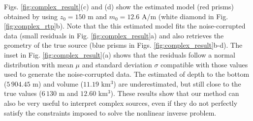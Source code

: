 Figs. \ref{fig:complex_result}(c) and (d) show the estimated model (red prisms) 
obtained by using $z_0 = 150$ m and $m_0 = 12.6 $ A/m 
(white diamond in Fig. \ref{fig:complex_rtp}b).
Note that the this estimated model fits the noise-corrupted data 
(small residuals in Fig. \ref{fig:complex_result}a) 
and also retrieves the geometry of the true source 
(blue prisms in Figs. \ref{fig:complex_result}b-d). 
The inset in Fig. \ref{fig:complex_result}(a) shows that the residuals follow a normal distribution with mean $ \mu $ and standard deviation $ \sigma $ compatible with those values used to generate the noise-corrupted data. 
The estimated of depth to the bottom ($ 5\,904.45 $ m) and volume ($ 11.19 $ km$^3 $) are underestimated, but still close to the true values ($ 6\,130 $ m and $ 12.60 $ km$^3 $). 
These results show that our method can also be very useful to interpret complex sources, even if they do not perfectly satisfy the constraints imposed to solve the nonlinear inverse problem.